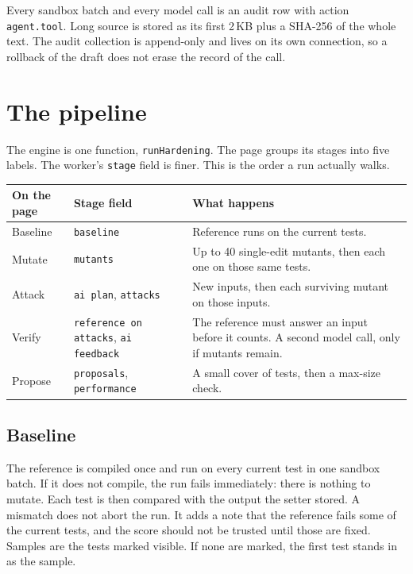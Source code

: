 \documentclass[10pt,a4paper]{article}
\begin{document}
Every sandbox batch and every model call is an audit row with action \texttt{agent.tool}. Long source is stored as its first 2\,KB plus a SHA-256 of the whole text. The audit collection is append-only and lives on its own connection, so a rollback of the draft does not erase the record of the call.

\section{The pipeline}

The engine is one function, \texttt{runHardening}. The page groups its stages into five labels. The worker's \texttt{stage} field is finer. This is the order a run actually walks.

\needspace{5.6cm}
\begin{center}
\small
\begin{tabularx}{\textwidth}{@{}l l Y@{}}
\toprule
\textbf{On the page} & \textbf{Stage field} & \textbf{What happens} \\
\midrule
Baseline & \texttt{baseline} & Reference runs on the current tests. \\
Mutate & \texttt{mutants} & Up to 40 single-edit mutants, then each one on those same tests. \\
Attack & \texttt{ai plan}, \texttt{attacks} & New inputs, then each surviving mutant on those inputs. \\
Verify & \texttt{reference on attacks}, \texttt{ai feedback} & The reference must answer an input before it counts. A second model call, only if mutants remain. \\
Propose & \texttt{proposals}, \texttt{performance} & A small cover of tests, then a max-size check. \\
\bottomrule
\end{tabularx}
\end{center}

\subsection{Baseline}

The reference is compiled once and run on every current test in one sandbox batch. If it does not compile, the run fails immediately: there is nothing to mutate. Each test is then compared with the output the setter stored. A mismatch does not abort the run. It adds a note that the reference fails some of the current tests, and the score should not be trusted until those are fixed. Samples are the tests marked visible. If none are marked, the first test stands in as the sample.
\end{document}
